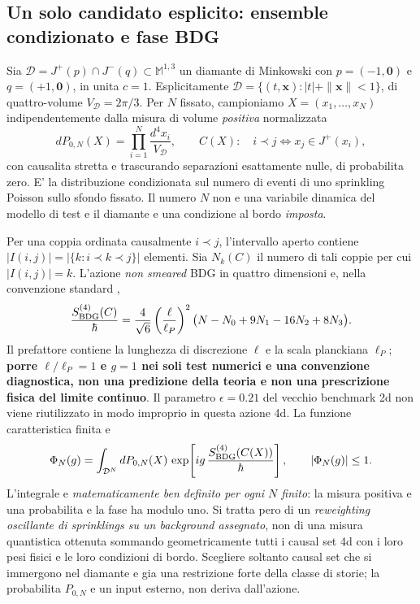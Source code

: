 \documentclass[11pt,a4paper]{article}
\begin{document}
\subsection{Un solo candidato esplicito: ensemble condizionato e fase BDG}

Sia $\mathcal D=J^+(p)\cap J^-(q)\subset\mathbb M^{1,3}$ un diamante di Minkowski con $p=(-1,\mathbf 0)$ e $q=(+1,\mathbf 0)$, in unita $c=1$. Esplicitamente $\mathcal D=\{(t,\mathbf x):|t|+\|\mathbf x\|<1\}$, di quattro-volume $V_{\mathcal D}=2\pi/3$. Per $N$ fissato, campioniamo $X=(x_1,\ldots,x_N)$ indipendentemente dalla misura di volume \emph{positiva} normalizzata
\begin{equation}
 dP_{0,N}(X)=\prod_{i=1}^{N}\frac{d^4x_i}{V_{\mathcal D}},
 \qquad C(X):\quad i\prec j\iff x_j\in J^+(x_i),
 \label{eq:r12aj_sprinkling}
\end{equation}
con causalita stretta e trascurando separazioni esattamente nulle, di probabilita zero. E' la distribuzione condizionata sul numero di eventi di uno sprinkling Poisson sullo sfondo fissato. Il numero $N$ non e una variabile dinamica del modello di test e il diamante e una condizione al bordo \emph{imposta}.

Per una coppia ordinata causalmente $i\prec j$, l'intervallo aperto contiene $|I(i,j)|=|\{k:i\prec k\prec j\}|$ elementi. Sia $N_k(C)$ il numero di tali coppie per cui $|I(i,j)|=k$. L'azione \emph{non smeared} BDG in quattro dimensioni e, nella convenzione standard \cite{BenincasaDowker2010,Surya2019Review},
\begin{equation}
 \frac{S^{(4)}_{\rm BDG}(C)}{\hbar}
 =\frac{4}{\sqrt 6}\left(\frac{\ell}{\ell_P}\right)^2
 \bigl(N-N_0+9N_1-16N_2+8N_3\bigr).
 \label{eq:r12aj_action4}
\end{equation}
Il prefattore contiene la lunghezza di discrezione $\ell$ e la scala planckiana $\ell_P$; \textbf{porre $\ell/\ell_P=1$ e $g=1$ nei soli test numerici e una convenzione diagnostica, non una predizione della teoria e non una prescrizione fisica del limite continuo}. Il parametro $\epsilon=0.21$ del vecchio benchmark 2d non viene riutilizzato in modo improprio in questa azione 4d. La funzione caratteristica finita e
\begin{equation}
 \Phi_N(g)=\int_{\mathcal D^N}dP_{0,N}(X)\,
 \exp\!\left[ig\,\frac{S^{(4)}_{\rm BDG}(C(X))}{\hbar}\right],
 \qquad |\Phi_N(g)|\le1.
 \label{eq:r12aj_phi4}
\end{equation}
L'integrale e \emph{matematicamente ben definito per ogni $N$ finito}: la misura positiva e una probabilita e la fase ha modulo uno. Si tratta pero di un \emph{reweighting oscillante di sprinklings su un background assegnato}, non di una misura quantistica ottenuta sommando geometricamente tutti i causal set 4d con i loro pesi fisici e le loro condizioni di bordo. Scegliere soltanto causal set che si immergono nel diamante e gia una restrizione forte della classe di storie; la probabilita $P_{0,N}$ e un input esterno, non deriva dall'azione.
\end{document}
